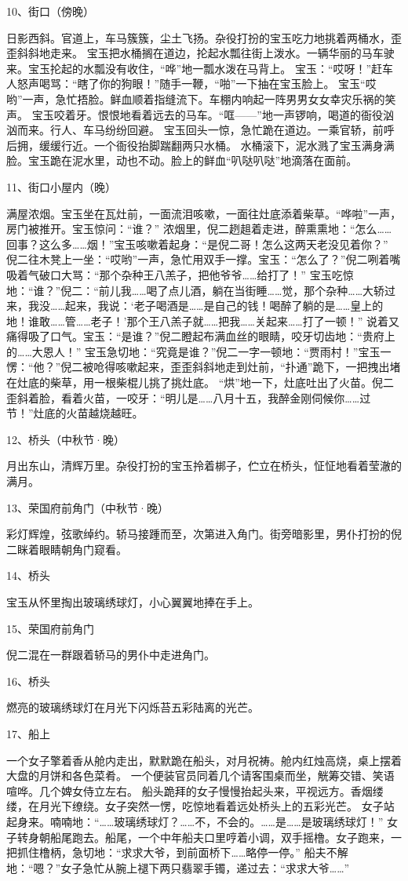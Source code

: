 10、街口（傍晚）\par
日影西斜。官道上，车马簇簇，尘土飞扬。杂役打扮的宝玉吃力地挑着两桶水，歪歪斜斜地走来。
宝玉把水桶搁在道边，抡起水瓢往街上泼水。一辆华丽的马车驶来。宝玉抡起的水瓢没有收住，“哗”地一瓢水泼在马背上。
宝玉：“哎呀！”赶车人怒声喝骂：“瞎了你的狗眼！”随手一鞭，“啪”一下抽在宝玉脸上。
宝玉“哎哟”一声，急忙捂脸。鲜血顺着指缝流下。车棚内响起一阵男男女女幸灾乐祸的笑声。
宝玉咬着牙。恨恨地看着远去的马车。“哐——”地一声锣响，喝道的衙役汹汹而来。行人、车马纷纷回避。
宝玉回头一惊，急忙跪在道边。一乘官轿，前呼后拥，缓缓行近。一个衙役抬脚踹翻两只水桶。
水桶滚下，泥水溅了宝玉满身满脸。宝玉跪在泥水里，动也不动。脸上的鲜血“叭哒叭哒”地滴落在面前。

11、街口小屋内（晚）\par
满屋浓烟。宝玉坐在瓦灶前，一面流泪咳嗽，一面往灶底添着柴草。“哗啦”一声，房门被推开。宝玉惊问：“谁？”
浓烟里，倪二趔趄着走进，醉熏熏地：“怎么……回事？这么多……烟！”宝玉咳嗽着起身：“是倪二哥！怎么这两天老没见着你？”
倪二往木凳上一坐：“哎哟”一声，急忙用双手一撑。宝玉：“怎么了？”倪二咧着嘴吸着气破口大骂：“那个杂种王八羔子，把他爷爷……给打了！”
宝玉吃惊地：“谁？”倪二：“前儿我……喝了点儿酒，躺在当街睡……觉，那个杂种……大轿过来，我没……起来，我说：‘老子喝酒是……是自己的钱！喝醉了躺的是……皇上的地！谁敢……管……老子！’那个王八羔子就……把我……关起来……打了一顿！”
说着又痛得吸了口气。宝玉：“是谁？”倪二瞪起布满血丝的眼睛，咬牙切齿地：“贵府上的……大恩人！”
宝玉急切地：“究竟是谁？”倪二一字一顿地：“贾雨村！”宝玉一愣：“他？”倪二被呛得咳嗽起来，歪歪斜斜地走到灶前，“扑通”跪下，一把拽出堵在灶底的柴草，用一根柴棍儿挑了挑灶底。
“烘”地一下，灶底吐出了火苗。倪二歪斜着脸，看着火苗，一咬牙：“明儿是……八月十五，我醉金刚伺候你……过节！”灶底的火苗越烧越旺。

12、桥头（中秋节·晚）\par
月出东山，清辉万里。杂役打扮的宝玉拎着梆子，伫立在桥头，怔怔地看着莹澈的满月。

13、荣国府前角门（中秋节·晚）\par
彩灯辉煌，弦歌绰约。轿马接踵而至，次第进入角门。街旁暗影里，男仆打扮的倪二眯着眼睛朝角门窥看。

14、桥头\par
宝玉从怀里掏出玻璃绣球灯，小心翼翼地捧在手上。

15、荣国府前角门\par
倪二混在一群跟着轿马的男仆中走进角门。

16、桥头\par
燃亮的玻璃绣球灯在月光下闪烁苔五彩陆离的光芒。

17、船上\par
一个女子擎着香从舱内走出，默默跪在船头，对月祝祷。舱内红烛高烧，桌上摆着大盘的月饼和各色菜肴。
一个便装官员同着几个请客围桌而坐，觥筹交错、笑语喧哗。几个婢女侍立左右。
船头跪拜的女子慢慢抬起头来，平视远方。香烟缕缕，在月光下缭绕。女子突然一愣，吃惊地看着远处桥头上的五彩光芒。
女子站起身来。喃喃地：“……玻璃绣球灯？……不，不会的。……是……是玻璃绣球灯！”
女子转身朝船尾跑去。船尾，一个中年船夫口里哼着小调，双手摇橹。女子跑来，一把抓住橹柄，急切地：“求求大爷，到前面桥下……略停一停。”
船夫不解地：“嗯？”女子急忙从腕上褪下两只翡翠手镯，递过去：“求求大爷……”

